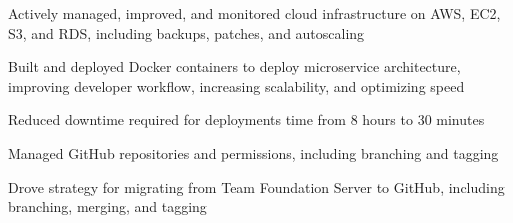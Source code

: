\begin{cventries}
{\begin{cvitems}

        \item {Actively managed, improved, and monitored cloud infrastructure on AWS, EC2, S3, and RDS, including backups, patches, and autoscaling}
        \item {Built and deployed Docker containers to deploy microservice architecture, improving developer workflow, increasing scalability, and optimizing speed}
        \item {Reduced downtime required for deployments time from 8 hours to 30 minutes}
        \item {Managed GitHub repositories and permissions, including branching and tagging}
        \item {Drove strategy for migrating from Team Foundation Server to GitHub, including branching, merging, and tagging}
      \end{cvitems}
    }


\end{cventries}
